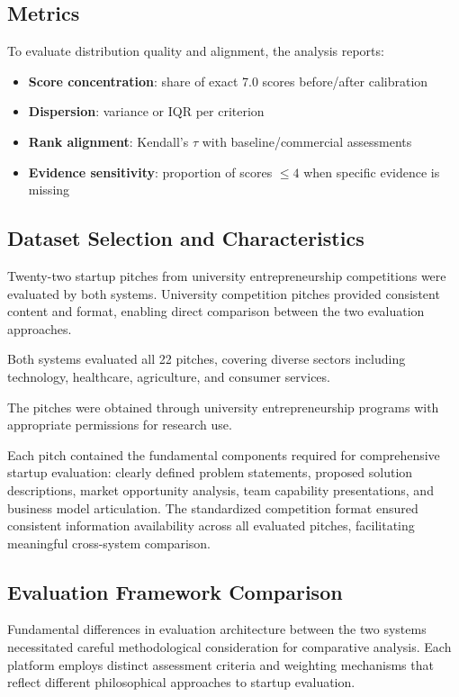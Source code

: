 \subsection{Metrics}
To evaluate distribution quality and alignment, the analysis reports:
\begin{itemize}
  \item \textbf{Score concentration}: share of exact 7.0 scores before/after calibration
  \item \textbf{Dispersion}: variance or IQR per criterion
  \item \textbf{Rank alignment}: Kendall's $\tau$ with baseline/commercial assessments
  \item \textbf{Evidence sensitivity}: proportion of scores $\leq 4$ when specific evidence is missing
\end{itemize}

\subsection{Dataset Selection and Characteristics}
\label{subsec:dataset}

Twenty-two startup pitches from university entrepreneurship competitions were evaluated by both systems. University competition pitches provided consistent content and format, enabling direct comparison between the two evaluation approaches.

Both systems evaluated all 22 pitches, covering diverse sectors including technology, healthcare, agriculture, and consumer services.

The pitches were obtained through university entrepreneurship programs with appropriate permissions for research use.

Each pitch contained the fundamental components required for comprehensive startup evaluation: clearly defined problem statements, proposed solution descriptions, market opportunity analysis, team capability presentations, and business model articulation. The standardized competition format ensured consistent information availability across all evaluated pitches, facilitating meaningful cross-system comparison.

\subsection{Evaluation Framework Comparison}
\label{subsec:frameworks}

Fundamental differences in evaluation architecture between the two systems necessitated careful methodological consideration for comparative analysis. Each platform employs distinct assessment criteria and weighting mechanisms that reflect different philosophical approaches to startup evaluation.

